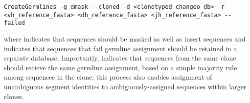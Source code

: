 \begin{lstlisting}
CreateGermlines -g dmask --cloned -d <clonotyped_changeo_db> -r <vh_reference_fasta> <dh_reference_fasta> <jh_reference_fasta> --failed
\end{lstlisting}

where  indicates that \dh sequences should be masked as well as insert sequences and  indicates that sequences that fail germline assignment should be retained in a separate database. Importantly,  indicates that sequences from the same clone should recieve the same germline assignment, based on a simple majority rule among sequences in the clone; this process also enables assignment of unambiguous segment identities to ambiguously-assigned sequences within larger clones.

%


